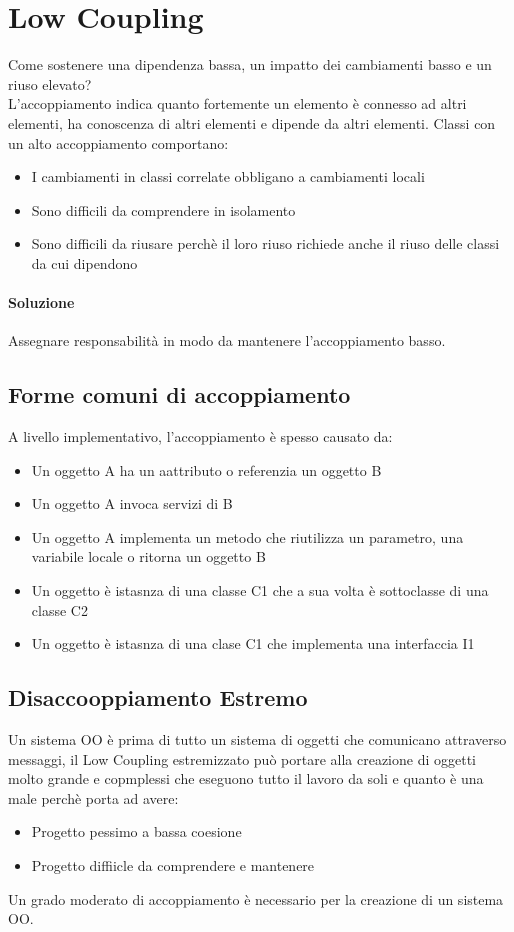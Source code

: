 \section{Low Coupling}
Come sostenere una dipendenza bassa, un impatto dei cambiamenti basso e un riuso elevato?
\\ L'accoppiamento indica quanto fortemente un elemento è connesso ad altri elementi,
ha conoscenza di altri elementi e dipende da altri elementi. Classi con un alto accoppiamento
comportano:
\begin{itemize}
    \item I cambiamenti in classi correlate obbligano a cambiamenti locali
    \item Sono difficili da comprendere in isolamento
    \item Sono difficili da riusare perchè il loro riuso richiede anche il riuso delle classi
    da cui dipendono
\end{itemize}
\paragraph*{Soluzione} Assegnare responsabilità in modo da mantenere l'accoppiamento basso.
\subsection*{Forme comuni di accoppiamento}
A livello implementativo, l'accoppiamento è spesso causato da:
\begin{itemize}
    \item Un oggetto A ha un aattributo o referenzia un oggetto B
    \item Un oggetto A invoca servizi di B
    \item Un oggetto A implementa un metodo che riutilizza un parametro, una variabile locale
    o ritorna un oggetto B
    \item Un oggetto è istasnza di una classe C1 che a sua volta è sottoclasse di una classe C2
    \item Un oggetto è istasnza di una clase C1 che implementa una interfaccia I1
\end{itemize}
\subsection*{Disaccooppiamento Estremo}
Un sistema OO è prima di tutto un sistema di oggetti che comunicano attraverso messaggi, 
il Low Coupling estremizzato può portare alla creazione di oggetti molto grande e copmplessi
che eseguono tutto il lavoro da soli e quanto è una male perchè porta ad avere:
\begin{itemize}
    \item Progetto pessimo a bassa coesione
    \item Progetto diffiicle da comprendere e mantenere
\end{itemize}
Un grado moderato di accoppiamento è necessario per la creazione di un sistema OO.
